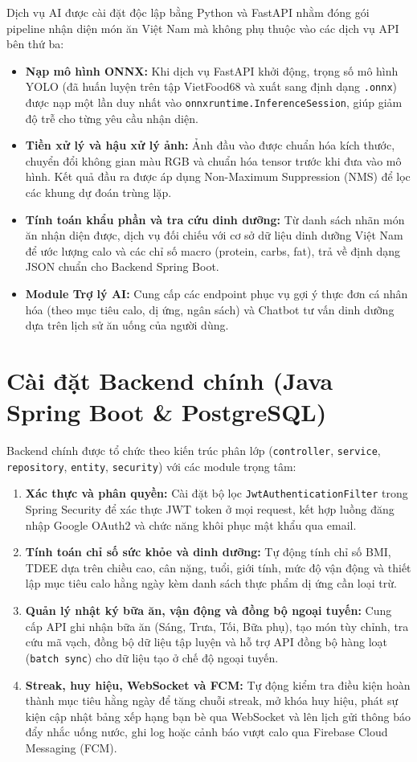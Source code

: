\documentclass[../main.tex]{subfiles}
\begin{document}
Dịch vụ AI được cài đặt độc lập bằng Python và FastAPI nhằm đóng gói pipeline nhận diện món ăn Việt Nam mà không phụ thuộc vào các dịch vụ API bên thứ ba:
\begin{itemize}
    \item \textbf{Nạp mô hình ONNX:} Khi dịch vụ FastAPI khởi động, trọng số mô hình YOLO (đã huấn luyện trên tập VietFood68 và xuất sang định dạng \texttt{.onnx}) được nạp một lần duy nhất vào \texttt{onnxruntime.InferenceSession}, giúp giảm độ trễ cho từng yêu cầu nhận diện.
    \item \textbf{Tiền xử lý và hậu xử lý ảnh:} Ảnh đầu vào được chuẩn hóa kích thước, chuyển đổi không gian màu RGB và chuẩn hóa tensor trước khi đưa vào mô hình. Kết quả đầu ra được áp dụng Non-Maximum Suppression (NMS) để lọc các khung dự đoán trùng lặp.
    \item \textbf{Tính toán khẩu phần và tra cứu dinh dưỡng:} Từ danh sách nhãn món ăn nhận diện được, dịch vụ đối chiếu với cơ sở dữ liệu dinh dưỡng Việt Nam để ước lượng calo và các chỉ số macro (protein, carbs, fat), trả về định dạng JSON chuẩn cho Backend Spring Boot.
    \item \textbf{Module Trợ lý AI:} Cung cấp các endpoint phục vụ gợi ý thực đơn cá nhân hóa (theo mục tiêu calo, dị ứng, ngân sách) và Chatbot tư vấn dinh dưỡng dựa trên lịch sử ăn uống của người dùng.
\end{itemize}

\section{Cài đặt Backend chính (Java Spring Boot \& PostgreSQL)}
\label{sec:4.3}

Backend chính được tổ chức theo kiến trúc phân lớp (\texttt{controller}, \texttt{service}, \texttt{repository}, \texttt{entity}, \texttt{security}) với các module trọng tâm:
\begin{enumerate}
    \item \textbf{Xác thực và phân quyền:} Cài đặt bộ lọc \texttt{JwtAuthenticationFilter} trong Spring Security để xác thực JWT token ở mọi request, kết hợp luồng đăng nhập Google OAuth2 và chức năng khôi phục mật khẩu qua email.
    \item \textbf{Tính toán chỉ số sức khỏe và dinh dưỡng:} Tự động tính chỉ số BMI, TDEE dựa trên chiều cao, cân nặng, tuổi, giới tính, mức độ vận động và thiết lập mục tiêu calo hằng ngày kèm danh sách thực phẩm dị ứng cần loại trừ.
    \item \textbf{Quản lý nhật ký bữa ăn, vận động và đồng bộ ngoại tuyến:} Cung cấp API ghi nhận bữa ăn (Sáng, Trưa, Tối, Bữa phụ), tạo món tùy chỉnh, tra cứu mã vạch, đồng bộ dữ liệu tập luyện và hỗ trợ API đồng bộ hàng loạt (\texttt{batch sync}) cho dữ liệu tạo ở chế độ ngoại tuyến.
    \item \textbf{Streak, huy hiệu, WebSocket và FCM:} Tự động kiểm tra điều kiện hoàn thành mục tiêu hằng ngày để tăng chuỗi streak, mở khóa huy hiệu, phát sự kiện cập nhật bảng xếp hạng bạn bè qua WebSocket và lên lịch gửi thông báo đẩy nhắc uống nước, ghi log hoặc cảnh báo vượt calo qua Firebase Cloud Messaging (FCM).
\end{enumerate}
\end{document}
